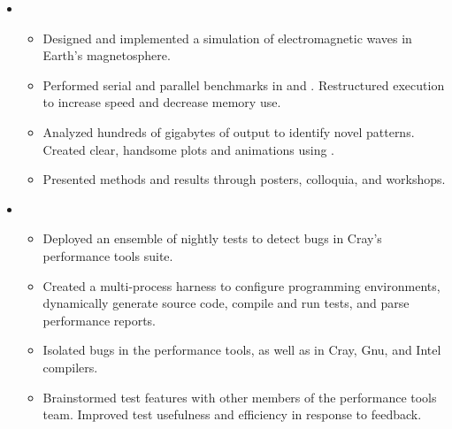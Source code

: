 
\begin{itemize}[leftmargin=\parindent]
  \parskip=0.1em
  \itemsep=1.5em

  \item[]
    \\
    \begin{itemize}
      \item Designed and implemented a simulation of electromagnetic waves in Earth's magnetosphere. 
      \item Performed serial and parallel benchmarks in \CPP and \Fortran. Restructured execution to increase speed and decrease memory use. 
      \item Analyzed hundreds of gigabytes of output to identify novel patterns. Created clear, handsome plots and animations using \matplotlib. 
      \item Presented methods and results through posters, colloquia, and workshops. 
    \end{itemize}

  \item[]
    \\
    \begin{itemize}
      \item Deployed an ensemble of nightly tests to detect bugs in Cray's performance tools suite. 
      \item Created a multi-process \Python harness to configure programming environments, dynamically generate source code, compile and run tests, and parse performance reports. 
      \item Isolated bugs in the performance tools, as well as in Cray, Gnu, and Intel compilers. 
      \item Brainstormed test features with other members of the performance tools team. Improved test usefulness and efficiency in response to feedback. 
    \end{itemize}


\end{itemize}
